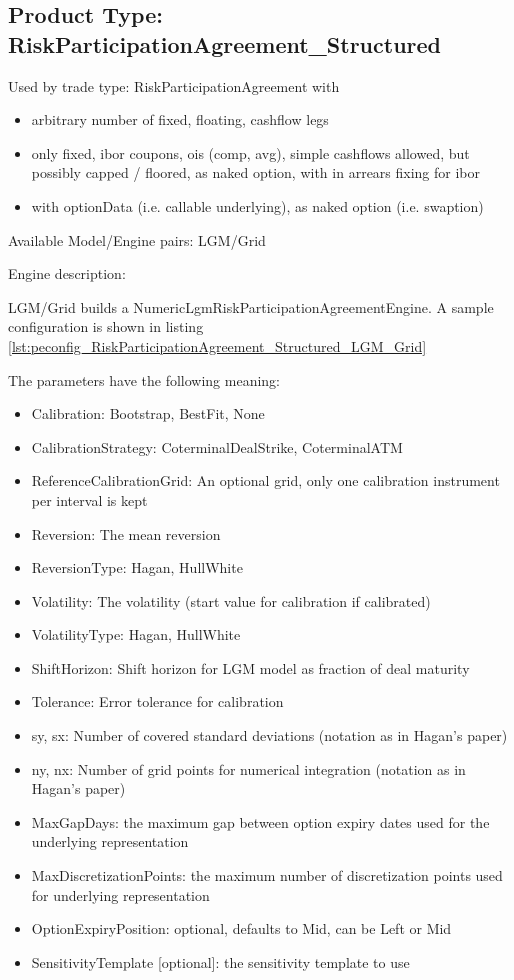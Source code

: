 \subsection{Product Type: RiskParticipationAgreement\_Structured}

Used by trade type: RiskParticipationAgreement with

\begin{itemize}
\item arbitrary number of fixed, floating, cashflow legs
\item only fixed, ibor coupons, ois (comp, avg), simple cashflows allowed, but possibly capped / floored,
  as naked option, with in arrears fixing for ibor
\item with optionData (i.e. callable underlying), as naked option (i.e. swaption)
\end{itemize} 

Available Model/Engine pairs: LGM/Grid

Engine description:

LGM/Grid builds a NumericLgmRiskParticipationAgreementEngine. A sample configuration is shown in listing
\ref{lst:peconfig_RiskParticipationAgreement_Structured_LGM_Grid}

The parameters have the following meaning:

\begin{itemize}
\item Calibration: Bootstrap, BestFit, None
\item CalibrationStrategy: CoterminalDealStrike, CoterminalATM
\item ReferenceCalibrationGrid: An optional grid, only one calibration instrument per interval is kept
\item Reversion: The mean reversion
\item ReversionType: Hagan, HullWhite
\item Volatility: The volatility (start value for calibration if calibrated)
\item VolatilityType: Hagan, HullWhite
\item ShiftHorizon: Shift horizon for LGM model as fraction of deal maturity
\item Tolerance: Error tolerance for calibration
\item sy, sx: Number of covered standard deviations (notation as in Hagan's paper)
\item ny, nx: Number of grid points for numerical integration (notation as in Hagan's paper)
\item MaxGapDays: the maximum gap between option expiry dates used for the underlying representation
\item MaxDiscretizationPoints: the maximum number of discretization points used for underlying representation
\item OptionExpiryPosition: optional, defaults to Mid, can be Left or Mid
\item SensitivityTemplate [optional]: the sensitivity template to use 
\end{itemize}

